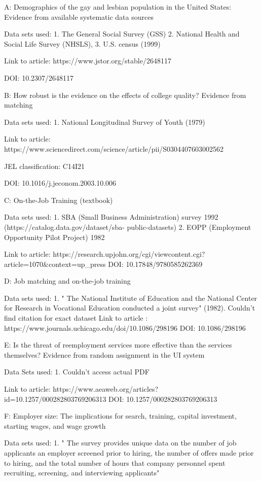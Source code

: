 A: Demographics of the gay and lesbian population in the United States: Evidence from available systematic data sources

	Data sets used: 
		1. The  General Social Survey (GSS)
		2. National Health and Social Life Survey (NHSLS),
		3. U.S. census (1999) 
	
	Link to article: https://www.jstor.org/stable/2648117
 
 	DOI: 10.2307/2648117
	
B: How robust is the evidence on the effects of college quality? Evidence from matching

	Data sets used: 
		1. National Longitudinal Survey of Youth (1979)
	
	Link to article: https://www.sciencedirect.com/science/article/pii/S0304407603002562
	
	JEL classification: C14I21
	
	DOI: 10.1016/j.jeconom.2003.10.006

 
C: On-the-Job Training (textbook)

	Data sets used: 
		1. SBA (Small Business Administration) survey 1992 (https://catalog.data.gov/dataset/sba-		public-datasets) 
		2. EOPP  (Employment Opportunity Pilot Project) 1982 

	Link to article: https://research.upjohn.org/cgi/viewcontent.cgi?article=1070&context=up_press
	DOI: 10.17848/9780585262369
	
D: Job matching and on-the-job training
	
	Data sets used: 
		1. " The National Institute of Education and the National Center for Research in Vocational 
		Education conducted a joint survey" (1982). Couldn't find citation for exact dataset 
	Link to article : https://www.journals.uchicago.edu/doi/10.1086/298196
	DOI: 10.1086/298196
	
E: Is the threat of reemployment services more effective than the services themselves? Evidence from random assignment in the UI system

	Data Sets used: 
		1. Couldn't access actual PDF 
		
	Link to article: https://www.aeaweb.org/articles?id=10.1257/000282803769206313
	DOI: 10.1257/000282803769206313

F: Employer size: The implications for search, training, capital investment, starting wages, and wage growth

	Data sets used: 
		1. " The survey provides unique data on the number of job applicants an
		 employer screened prior to hiring, the number of offers made prior to
 		hiring, and the total number of hours that company personnel spent
 		recruiting, screening, and interviewing applicants"
	

